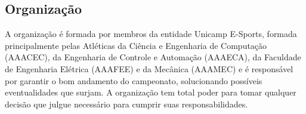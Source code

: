 \subsection{Organização}

A organização é formada por membros da entidade Unicamp E-Sports, formada principalmente pelas Atléticas da Ciência e Engenharia de Computação (AAACEC), da Engenharia de Controle e Automação (AAAECA), da Faculdade de Engenharia Elétrica (AAAFEE) e da Mecânica (AAAMEC) e é responsável por garantir o bom andamento do campeonato, solucionando possíveis eventualidades que surjam. A organização tem total poder para tomar qualquer decisão que julgue necessário para cumprir suas responsabilidades.